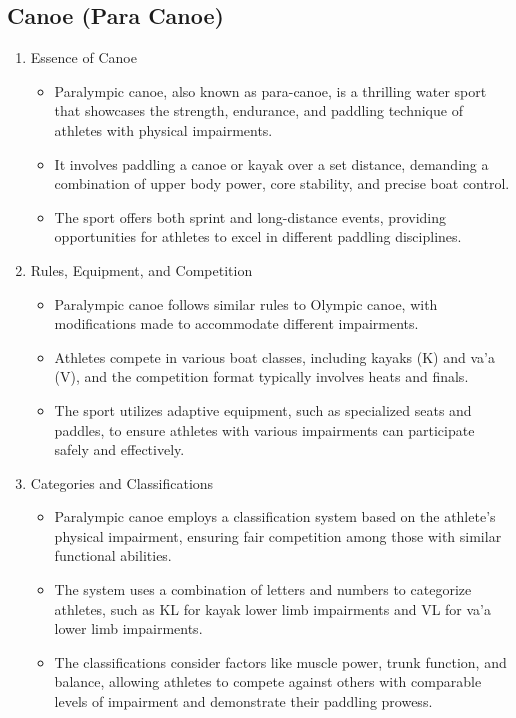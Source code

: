 \subsection{Canoe (Para Canoe)}

\begin{enumerate}

\item Essence of Canoe
    \begin{itemize}
    \item Paralympic canoe, also known as para-canoe, is a thrilling water sport that showcases the strength, endurance, and paddling technique of athletes with physical impairments. 
    \item It involves paddling a canoe or kayak over a set distance, demanding a combination of upper body power, core stability, and precise boat control. 
    \item The sport offers both sprint and long-distance events, providing opportunities for athletes to excel in different paddling disciplines.
    \end{itemize}

\item Rules, Equipment, and Competition
    \begin{itemize}
    \item Paralympic canoe follows similar rules to Olympic canoe, with modifications made to accommodate different impairments. 
    \item Athletes compete in various boat classes, including kayaks (K) and va'a (V), and the competition format typically involves heats and finals. 
    \item The sport utilizes adaptive equipment, such as specialized seats and paddles, to ensure athletes with various impairments can participate safely and effectively.
    \end{itemize}

\item Categories and Classifications
    \begin{itemize}
    \item Paralympic canoe employs a classification system based on the athlete's physical impairment, ensuring fair competition among those with similar functional abilities. 
    \item The system uses a combination of letters and numbers to categorize athletes, such as KL for kayak lower limb impairments and VL for va'a lower limb impairments. 
    \item The classifications consider factors like muscle power, trunk function, and balance, allowing athletes to compete against others with comparable levels of impairment and demonstrate their paddling prowess.
    \end{itemize}

\end{enumerate}